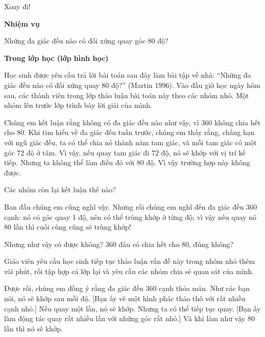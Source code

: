   {
    Xoay đi!
  }
  {
    \textbf{Nhiệm vụ}

    Những đa giác đều nào có đối xứng quay góc 80 độ?

    \textbf{Trong lớp học (lớp hình học)}

    Học sinh được yêu cầu trả lời bài toán sau đây làm bài tập về nhà: ``Những đa giác đều nào có đối xứng quay 80 độ?'' (Martin 1996). Vào đầu giờ học ngày hôm sau, các thành viên trong lớp thảo luận bài toán này theo các nhóm nhỏ. Một nhóm lên trước lớp trình bày lời giải của mình.

    \begin{scriptlist}
      \item [Học sinh 1:] Chúng em kết luận rằng không có đa giác đều nào như vậy, vì $360$ không chia hết cho $80$. Khi tìm hiểu về đa giác đều tuần trước, chúng em thấy rằng, chẳng hạn với ngũ giác đều, ta có thể chia nó thành năm tam giác, và mỗi tam giác có một góc $72$ độ ở tâm. Vì vậy, nếu quay tam giác đi $72$ độ, nó sẽ khớp với vị trí kế tiếp. Nhưng ta không thể làm điều đó với $80$ độ. Vì vậy trường hợp này không được.

      \item [Giáo viên:] Các nhóm còn lại kết luận thế nào?
      
      \item [Học sinh 2:] Ban đầu chúng em cũng nghĩ vậy. Nhưng rồi chúng em nghĩ đến đa giác đều 360 cạnh: nó có góc quay 1 độ, nên có thể trùng khớp ở từng độ; vì vậy nếu quay nó $80$ lần thì cuối cùng cũng sẽ trùng khớp!
      
      \item [Học sinh 1:] Nhưng như vậy có được không? $360$ đâu có chia hết cho $80$, đúng không?
    \end{scriptlist}

    Giáo viên yêu cầu học sinh tiếp tục thảo luận vấn đề này trong nhóm nhỏ thêm vài phút, rồi tập hợp cả lớp lại và yêu cầu các nhóm chia sẻ quan sát của mình.\vspace{\baselineskip}

    \begin{scriptlist}
      \item [Học sinh 3:] Được rồi, chúng em đồng ý rằng đa giác đều 360 cạnh thỏa mãn. Như các bạn nói, nó sẽ khớp sau mỗi độ. [Bạn ấy vẽ một hình phác thảo thô với rất nhiều cạnh nhỏ.] Nếu quay một lần, nó sẽ khớp. Nhưng ta có thể tiếp tục quay. [Bạn ấy làm động tác quay rất nhiều lần với những góc rất nhỏ.] Và khi làm như vậy $80$ lần thì nó sẽ khớp.


\end{scriptlist}}
